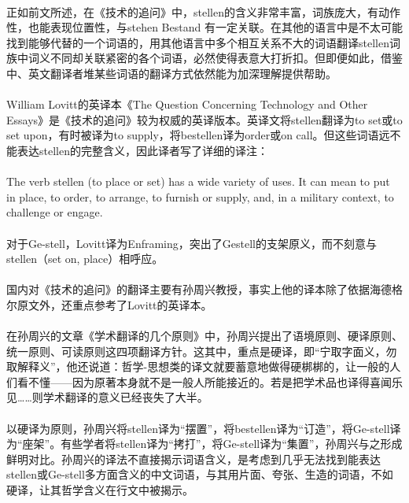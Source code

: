 \documentclass{article}
\begin{document}
		\paragraph{}
		正如前文所述，在《技术的追问》中，stellen的含义非常丰富，词族庞大，有动作性，也能表现位置性，与stehen Bestand 有一定关联。在其他的语言中是不太可能找到能够代替的一个词语的，用其他语言中多个相互关系不大的词语翻译stellen词族中词义不同却关联紧密的各个词语，必然使得表意大打折扣。但即便如此，借鉴中、英文翻译者堆某些词语的翻译方式依然能为加深理解提供帮助。
		\paragraph{}
		William Lovitt的英译本《The Question Concerning Technology and Other Essays》\cite{Quest_Concern_Tech}是《技术的追问》较为权威的英译版本。英译文将stellen翻译为to set或to set upon，有时被译为to supply，将bestellen译为order或on call。但这些词语远不能表达stellen的完整含义，因此译者写了详细的译注：
		\paragraph{}
		The verb stellen (to place or set) has a wide variety of uses. It can mean to put in place, to order, to arrange, to furnish or supply, and, in a
military context, to challenge or engage.\cite[pg. 15]{Quest_Concern_Tech}
		\paragraph{}
		对于Ge-stell，Lovitt译为Enframing，突出了Gestell的支架原义，而不刻意与stellen（set on, place）相呼应。
		\paragraph{}
		国内对《技术的追问》的翻译主要有孙周兴教授，事实上他的译本除了依据海德格尔原文外，还重点参考了Lovitt的英译本。
		\paragraph{}
		在孙周兴的文章《学术翻译的几个原则》\cite{Aca_Transl_SZx}中，孙周兴提出了语境原则、硬译原则、统一原则、可读原则这四项翻译方针。这其中，重点是硬译，即“宁取字面义，勿取解释义”，他还说道：哲学-思想类的译文就要蓄意地做得硬梆梆的，让一般的人们看不懂——因为原著本身就不是一般人所能接近的。若是把学术品也译得喜闻乐见……则学术翻译的意义已经丧失了大半。
		\paragraph{}
		以硬译为原则，孙周兴将stellen译为“摆置”，将bestellen译为“订造”，将Ge-stell译为“座架”。有些学者将stellen译为“拷打”，将Ge-stell译为“集置”，孙周兴与之形成鲜明对比。孙周兴的译法不直接揭示词语含义，是考虑到几乎无法找到能表达stellen或Ge-stell多方面含义的中文词语，与其用片面、夸张、生造的词语，不如硬译，让其哲学含义在行文中被揭示。
		
\end{document}
